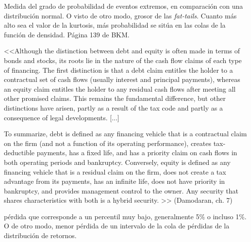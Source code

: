 \documentclass{nuevotema}
\begin{document}



Medida del grado de probabilidad de eventos extremos, en comparación con una distribución normal. O visto de otro modo, grosor de las \textit{fat-tails}. Cuanto más alto sea el valor de la kurtosis, más probabilidad se sitúa en las colas de la función de densidad. Página 139 de BKM.

<<Although the distinction between debt and equity is often made in terms of bonds and stocks, its roots lie in the nature of the cash flow claims of each type of financing. The first distinction is that a debt claim entitles the holder to a contractual set of cash flows (usually interest and principal payments), whereas an equity claim entitles the holder to any residual cash flows after meeting all other promised claims. This remains the fundamental difference, but other distinctions have arisen, partly as a result of the tax code and partly as a consequence of legal developments. 
    [...]
    
To summarize, debt is defined as any financing vehicle that is a contractual claim on the firm (and
not a function of its operating performance), creates tax-deductible payments, has a fixed life, and has
a priority claim on cash flows in both operating periods and bankruptcy. Conversely, equity is defined
as any financing vehicle that is a residual claim on the firm, does not create a tax advantage from its
payments, has an infinite life, does not have priority in bankruptcy, and provides management control
to the owner. Any security that shares characteristics with both is a hybrid security.
>> (Damodaran, ch. 7)

 pérdida que corresponde a un percentil muy bajo, generalmente 5\% o incluso 1\%. O de otro modo, menor pérdida de un intervalo de la cola de pérdidas de la distribución de retornos.
\end{document}
